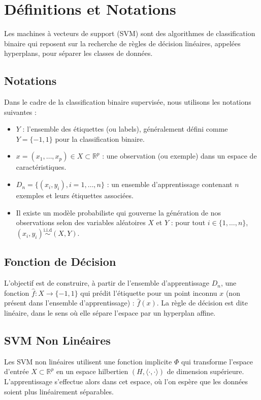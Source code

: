 \documentclass{article}
\begin{document}
\section{Définitions et Notations}


Les machines à vecteurs de support (SVM) sont des algorithmes de
classification binaire qui reposent sur la recherche de règles de 
décision linéaires, appelées hyperplans, pour séparer les classes de 
données.

\subsection{Notations}
Dans le cadre de la classification binaire supervisée, nous utilisons les 
notations suivantes :

\begin{itemize}
    \item $Y$ : l'ensemble des étiquettes (ou labels), généralement défini comme $Y = \{-1, 1\}$ pour la classification binaire.
    \item $x = (x_1, \ldots, x_p) \in X \subset \mathbb{R}^p$ : une observation (ou exemple) dans un espace de caractéristiques.
    \item $D_n = \{(x_i, y_i), i = 1, \ldots, n\}$ : un ensemble d'apprentissage contenant $n$ exemples et leurs étiquettes associées.
    \item Il existe un modèle probabiliste qui gouverne la génération de nos observations selon des variables aléatoires $X$ et $Y$ : pour tout $i \in \{1, \ldots, n\}$, $(x_i, y_i) \overset{\text{i.i.d}}{\sim} (X, Y)$.
\end{itemize}

\subsection{Fonction de Décision}
L'objectif est de construire, à partir de l'ensemble d'apprentissage 
$D_n$, une fonction $\hat{f} : X \to \{-1, 1\}$ qui prédit l'étiquette 
pour un point inconnu $x$ (non présent dans l'ensemble d'apprentissage) : 
$\hat{f}(x)$. La règle de décision est dite linéaire, dans le sens où 
elle sépare l'espace par un hyperplan affine.

\subsection{SVM Non Linéaires}
Les SVM non linéaires utilisent une fonction implicite $\Phi$ qui 
transforme l'espace d'entrée $X \subset \mathbb{R}^p$ en un espace
hilbertien $(H, \langle \cdot, \cdot \rangle)$ de dimension supérieure.
L'apprentissage s'effectue alors dans cet espace, où l'on espère que les 
données soient plus linéairement séparables.
\end{document}

